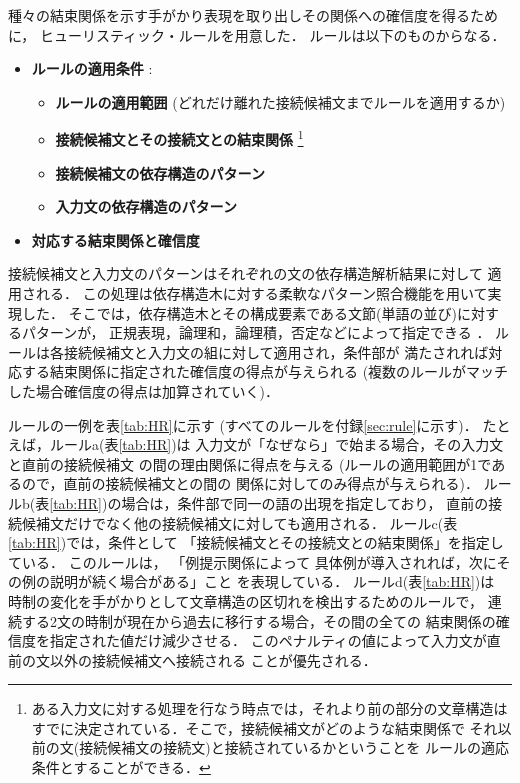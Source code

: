 種々の結束関係を示す手がかり表現を取り出しその関係への確信度を得るために，
ヒューリスティック・ルールを用意した．
ルールは以下のものからなる．
\begin{itemize}
\item {\bf ルールの適用条件} :
  \begin{itemize}
  \item {\bf ルールの適用範囲} 
    (どれだけ離れた接続候補文までルールを適用するか)
  \item {\bf 接続候補文とその接続文との結束関係}
\footnote{
ある入力文に対する処理を行なう時点では，それより前の部分の文章構造は
すでに決定されている．そこで，接続候補文がどのような結束関係で
それ以前の文(接続候補文の接続文)と接続されているかということを
ルールの適応条件とすることができる．}
  \item {\bf 接続候補文の依存構造のパターン}
  \item {\bf 入力文の依存構造のパターン}
  \end{itemize}
\item {\bf 対応する結束関係と確信度}
\end{itemize}
接続候補文と入力文のパターンはそれぞれの文の依存構造解析結果に対して
適用される\cite{KurohashiAndNagao1994}．
この処理は依存構造木に対する柔軟なパターン照合機能を用いて実現した．
そこでは，依存構造木とその構成要素である文節(単語の並び)に対するパターンが，
正規表現，論理和，論理積，否定などによって指定できる
\cite{MurataAndNagao1993}．
ルールは各接続候補文と入力文の組に対して適用され，条件部が
満たされれば対応する結束関係に指定された確信度の得点が与えられる
(複数のルールがマッチした場合確信度の得点は加算されていく)．

ルールの一例を表\ref{tab:HR}に示す
(すべてのルールを付録\ref{sec:rule}に示す)．
たとえば，ルールa(表\ref{tab:HR})は
入力文が「なぜなら」で始まる場合，その入力文と直前の接続候補文
の間の理由関係に得点を与える
(ルールの適用範囲が1であるので，直前の接続候補文との間の
関係に対してのみ得点が与えられる)．
ルールb(表\ref{tab:HR})の場合は，条件部で同一の語の出現を指定しており，
直前の接続候補文だけでなく他の接続候補文に対しても適用される．
ルールc(表\ref{tab:HR})では，条件として
「接続候補文とその接続文との結束関係」を指定している．
このルールは，
「例提示関係によって
具体例が導入されれば，次にその例の説明が続く場合がある」こと
を表現している．
ルールd(表\ref{tab:HR})は
時制の変化を手がかりとして文章構造の区切れを検出するためのルールで，
連続する2文の時制が現在から過去に移行する場合，その間の全ての
結束関係の確信度を指定された値だけ減少させる．
このペナルティの値によって入力文が直前の文以外の接続候補文へ接続される
ことが優先される．

